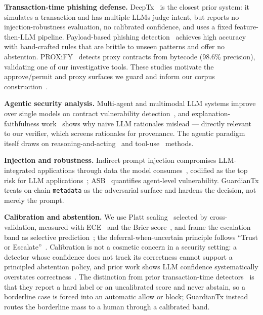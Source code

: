 \documentclass[conference]{IEEEtran}
\begin{document}
\textbf{Transaction-time phishing defense.} DeepTx~\cite{liu2025deeptx} is the
closest prior system: it simulates a transaction and has multiple LLMs judge intent,
but reports no injection-robustness evaluation, no calibrated confidence, and uses a
fixed feature-then-LLM pipeline. Payload-based phishing
detection~\cite{chen2025payload} achieves high accuracy with hand-crafted rules that
are brittle to unseen patterns and offer no abstention. PROXiFY~\cite{qasse2025proxify}
detects proxy contracts from bytecode (98.6\% precision), validating one of our
investigative tools. These studies motivate the approve/permit and proxy surfaces we
guard and inform our corpus construction~\cite{he2025daas,tsuchiya2025poisoning}.

\textbf{Agentic security analysis.} Multi-agent and multimodal LLM systems improve
over single models on contract vulnerability
detection~\cite{jie2025agent4vul,wei2025smartaudit}, and explanation-faithfulness
work~\cite{yu2025smartllama} shows why naive LLM rationales mislead --- directly
relevant to our verifier, which screens rationales for provenance. The agentic
paradigm itself draws on reasoning-and-acting~\cite{yao2023react} and
tool-use~\cite{schick2023toolformer,wei2022cot} methods.

\textbf{Injection and robustness.} Indirect prompt injection compromises
LLM-integrated applications through data the model
consumes~\cite{greshake2023injection,perez2022ignore}, codified as the top risk for
LLM applications~\cite{owasp2025llm}; ASB~\cite{zhang2025asb} quantifies agent-level
vulnerability. GuardianTx treats on-chain \texttt{metadata} as the adversarial
surface and hardens the decision, not merely the prompt.

\textbf{Calibration and abstention.} We use Platt scaling~\cite{niculescu2005predicting}
selected by cross-validation, measured with ECE~\cite{naeini2015obtaining} and the
Brier score~\cite{brier1950verification}, and frame the escalation band as selective
prediction~\cite{geifman2017selective}; the deferral-when-uncertain principle follows
``Trust or Escalate''~\cite{jung2025trust}. Calibration is not a cosmetic concern in a
security setting: a detector whose confidence does not track its correctness cannot
support a principled abstention policy, and prior work shows LLM confidence
systematically overstates correctness~\cite{jung2025trust}. The distinction from prior
transaction-time detectors~\cite{liu2025deeptx,chen2025payload} is that they report a
hard label or an uncalibrated score and never abstain, so a borderline case is forced
into an automatic allow or block; GuardianTx instead routes the borderline mass to a
human through a calibrated band.
\end{document}
